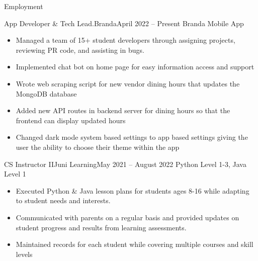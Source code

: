 \documentclass[]{mcdowellcv}
\begin{document}
	\makeheader
	
	\begin{cvsection}{Employment}
		\begin{cvsubsection}{App Developer \& Tech Lead.}{Branda}{April 2022 – Present}
			Branda Mobile App			
			\begin{itemize}
				\item Managed a team of 15+ student developers through assigning projects, reviewing PR code, and assisting in bugs.
				\item Implemented chat bot on home page for easy information access and support
				\item Wrote web scraping script for new vendor dining hours that updates the MongoDB database
				\item Added new API routes in backend server for dining hours so that the frontend can display updated hours
				\item Changed dark mode system based settings to app based settings giving the user the ability to choose their theme within the app
			\end{itemize}
		\end{cvsubsection}
		
		\begin{cvsubsection}{CS Instructor II}{Juni Learning}{May 2021 – August 2022}
			Python Level 1-3, Java Level 1	
			\begin{itemize}
				\item Executed Python \& Java lesson plans for students ages 8-16 while adapting to student needs and interests.
				\item Communicated with parents on a regular basis and provided updates on student progress and results from learning assessments.
				\item Maintained records for each student while covering multiple courses and skill levels
			\end{itemize}
		\end{cvsubsection}
		
	\end{cvsection}
	
\end{document}
